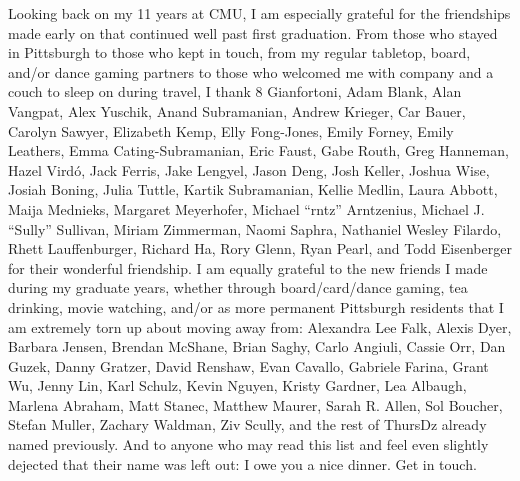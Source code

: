 \documentclass[12pt]{cmuthesis}
\begin{document}
\begin{acknowledgments}
{Looking back on my 11 years at CMU,
I am especially grateful for the friendships made early on %
that continued well past first graduation.
From those who stayed in Pittsburgh %
to those who %
kept in touch,
from my regular tabletop, board, and/or dance gaming partners
to those who %
welcomed me with company and
a couch to sleep on during travel,
I thank
8 Gianfortoni,
Adam Blank,
Alan Vangpat,
Alex Yuschik,
Anand Subramanian,
Andrew Krieger,
Car Bauer,
Carolyn Sawyer,
Elizabeth Kemp,
Elly Fong-Jones,
Emily Forney,
Emily Leathers,
Emma Cating-Subramanian,
Eric Faust,
Gabe Routh,
Greg Hanneman,
Hazel Vird\'{o},
Jack Ferris,
Jake Lengyel,
Jason Deng,
Josh Keller,
Joshua Wise,
Josiah Boning,
Julia Tuttle,
Kartik Subramanian,
Kellie Medlin,
Laura Abbott,
Maija Mednieks,
Margaret Meyerhofer,
Michael ``rntz'' Arntzenius,
Michael J. ``Sully'' Sullivan,
Miriam Zimmerman,
Naomi Saphra,
Nathaniel Wesley Filardo,
Rhett Lauffenburger,
Richard Ha,
Rory Glenn,
Ryan Pearl,
and
Todd Eisenberger
for their wonderful friendship.
I am equally grateful to the new friends I made during my graduate years,
whether through board/card/dance gaming, tea drinking, %
movie watching,
and/or as more permanent Pittsburgh residents that I am extremely torn up about moving away from:
Alexandra Lee Falk,
Alexis Dyer,
Barbara Jensen,
Brendan McShane,
Brian Saghy,
Carlo Angiuli,
Cassie Orr,
Dan Guzek,
Danny Gratzer,
David Renshaw,
Evan Cavallo,
Gabriele Farina,
Grant Wu,
Jenny Lin,
Karl Schulz,
Kevin Nguyen,
Kristy Gardner,
Lea Albaugh,
Marlena Abraham,
Matt Stanec,
Matthew Maurer,
Sarah R. Allen,
Sol Boucher,
Stefan Muller,
Zachary Waldman,
Ziv Scully,
and the rest of ThursDz already named previously.
And to anyone who may read this list
and feel even slightly dejected that their name was left out:
I owe you a nice dinner. Get in touch.

}
\end{acknowledgments}
\end{document}
